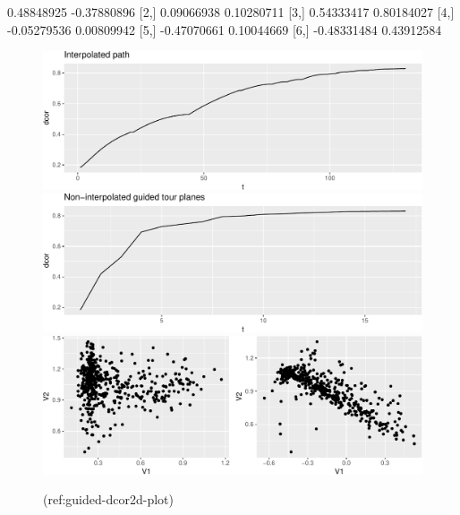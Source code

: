 \documentclass[article]{jss}
\begin{document}
\begin{CodeChunk}

\begin{CodeOutput}
            [,1]        [,2]
[1,]  0.48848925 -0.37880896
[2,]  0.09066938  0.10280711
[3,]  0.54333417  0.80184027
[4,] -0.05279536  0.00809942
[5,] -0.47070661  0.10044669
[6,] -0.48331484  0.43912584
\end{CodeOutput}
\begin{figure}

{\centering \includegraphics[width=\textwidth]{figure/guided-dcor2d-plot-no-gminus2-1} \includegraphics[width=\textwidth]{figure/guided-dcor2d-plot-no-gminus2-2} \includegraphics[width=\textwidth]{figure/guided-dcor2d-plot-no-gminus2-3} 

}

\caption[(ref:guided-dcor2d-plot)]{(ref:guided-dcor2d-plot)}\label{fig:guided-dcor2d-plot-no-gminus2}
\end{figure}
\end{CodeChunk}
\end{document}
